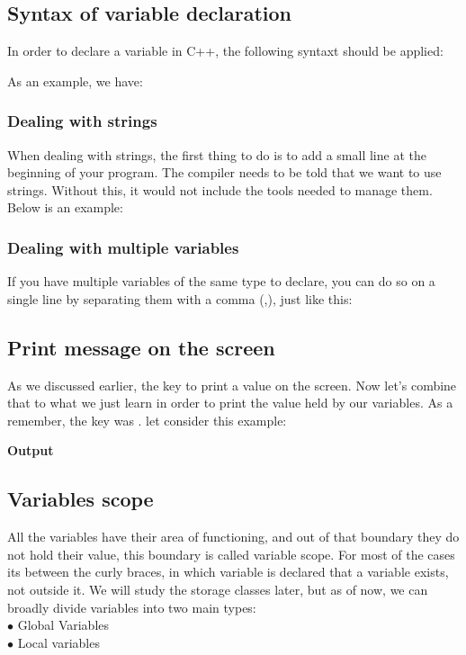 \documentclass[11pt, a4paper]{article}
\begin{document}
\subsection{Syntax of variable declaration}
In order to declare a variable in C++, the following syntaxt should be applied:

As an example, we have:


\subsubsection{Dealing with strings}
When dealing with strings, the first thing to do is to add a small line at the beginning of your program.
The compiler needs to be told that we want to use strings. Without this, it
would not include the tools needed to manage them. Below is an example:


\subsubsection{Dealing with multiple variables}
If you have multiple variables of the same type to declare, you can do so on a single line
by separating them with a comma (,), just like this:


\subsection{Print message on the screen}
As we discussed earlier, the key to print a value on the screen. Now let's combine that to
what we just learn in order to print the value held by our variables. As a remember, the key
was . let consider this example:

\textbf{Output}


\subsection{Variables scope}
All the variables have their area of functioning, and out of that boundary they do not
hold their value, this boundary is called variable scope. For most of the
cases its between the curly braces, in which variable is declared that a variable
exists, not outside it. We will study the storage classes later, but as of now,
we can broadly divide variables into two main types:\\
$\bullet$ Global Variables\\
$\bullet$ Local variables
\end{document}
